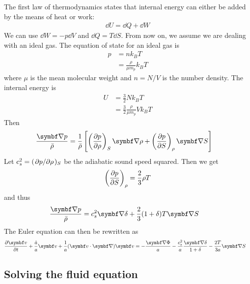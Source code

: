 The first law of thermodynamics states that internal energy can either be added by the means of heat or work:
\begin{align*}
	\dd{U} = \dd{Q} + \dd{W}
\end{align*}
We can use $\dd{W} = - p \dd{V}$ and $\dd{Q} = T \dd{S}$. From now on, we assume we are dealing with an ideal gas. The equation of state for an ideal gas is
\begin{align*}
	p
	&= n k_B T\\
	&= \frac{\rho}{\mu m_p} k_B T
\end{align*}
where $\mu$ is the mean molecular weight and $n = N/V$ is the number density. The internal energy is
\begin{align*}
	U
	&= \frac{3}{2} N k_B T\\
	&= \frac{3}{2} \frac{\rho}{\mu m_p} V k_B T
\end{align*}
Then
\begin{align*}
	\frac{\Grad p}{\bar{\rho}}
	&= \frac{1}{\bar{\rho}}
	\left[ 
		\left( \pdv{p}{\rho} \right)_S \Grad \rho
		+ 
		\left( \pdv{p}{S} \right)_\rho \Grad S
	\right]
\end{align*}
Let $c_s^2 = (\pdv*{p}{\rho})_S$ be the adiabatic sound speed squared. Then we get
\begin{align*}
	\left( \pdv{p}{S} \right)_\rho = \frac{2}{3} \rho T
\end{align*}
and thus
\begin{align*}
	\frac{\Grad p}{\bar{\rho}}
	&= c_s^2 \Grad \delta + \frac{2}{3} (1+\delta) T \Grad S
\end{align*}
The Euler equation can then be rewritten as
\begin{align*}
	\pdv{\vec{v}}{t} + \frac{\dot{a}}{a} \vec{v} + \frac{1}{a} (\vec{v} \cdot \Grad) \vec{v}
	&= - \frac{\Grad \Phi}{a} - \frac{c_s^2}{a} \frac{\Grad \delta}{1 + \delta} - \frac{2T}{3a} \Grad S
\end{align*}

\subsection*{Solving the fluid equation}

